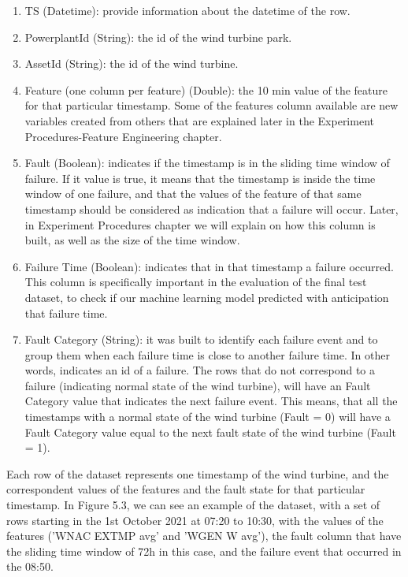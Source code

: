 \begin{enumerate}
    \item
TS (Datetime): provide information about the datetime of the row.
    \item
PowerplantId (String): the id of the wind turbine park.
    \item
AssetId (String): the id of the wind turbine.
    \item
Feature (one column per feature) (Double): the 10 min value of the feature for that particular timestamp. Some of the features column available are new variables created from others that are explained later in the Experiment Procedures-Feature Engineering chapter.
    \item
Fault (Boolean): indicates if the timestamp is in the sliding time window of failure. If it value is true, it means that the timestamp is inside the time window of one failure, and that the values of the feature of that same timestamp should be considered as indication that a failure will occur. Later, in Experiment Procedures chapter we will explain on how this column is built, as well as the size of the time window.
    \item
Failure Time (Boolean): indicates that in that timestamp a failure occurred. This column is specifically important in the evaluation of the final test dataset, to check if our machine learning model predicted with anticipation that failure time.
    \item
Fault Category (String): it was built to identify each failure event and to group them when each failure time is close to another failure time. In other words, indicates an id of a failure. The rows that do not correspond to a failure (indicating normal state of the wind turbine), will have an Fault Category value that indicates the next failure event. This means, that all the timestamps with a normal state of the wind turbine (Fault = 0) will have a Fault Category value equal to the next fault state of the wind turbine (Fault = 1).

\end{enumerate}

Each row of the dataset represents one timestamp of the wind turbine, and the correspondent values of the features and the fault state for that particular timestamp. In Figure 5.3, we can see an example of the dataset, with a set of rows starting in the 1st October 2021 at 07:20 to 10:30, with the values of the features ('WNAC EXTMP avg' and 'WGEN W avg'), the fault column that have the sliding time window of 72h in this case, and the failure event that occurred in the 08:50.

